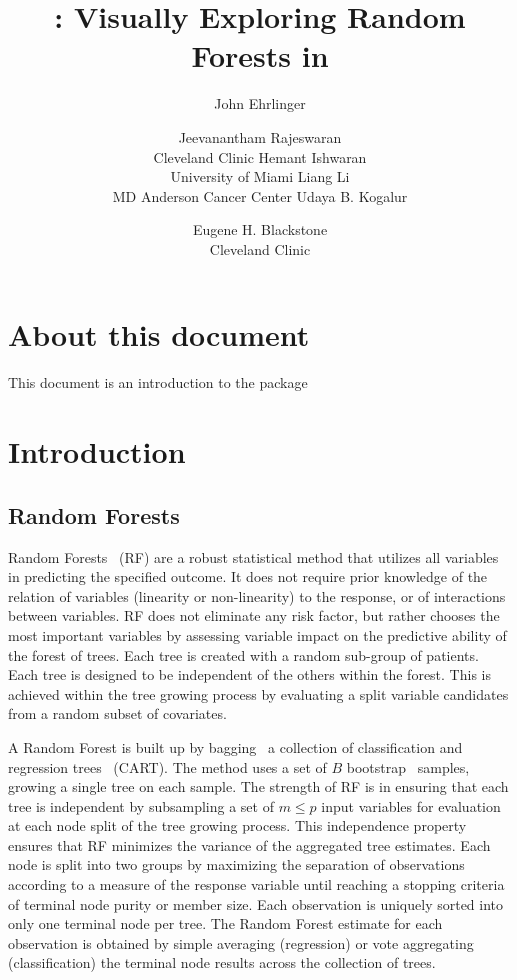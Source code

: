 \documentclass[nojss]{jss}\usepackage[]{graphicx}\usepackage[]{color}
\author{John Ehrlinger \and Jeevanantham Rajeswaran\\Cleveland Clinic 
\AND Hemant Ishwaran \\University of Miami
\And Liang Li\\MD Anderson Cancer Center
\AND Udaya B. Kogalur \and Eugene H. Blackstone\\Cleveland Clinic}
\title{{\pkg{ggRandomForests}}: Visually Exploring Random Forests in \proglang{R}}
\begin{document}



\section{About this document}
This document is an introduction to the  package

\section{Introduction} \label{S:introduction}


\subsection{Random Forests}\label{S:rf}
Random Forests~\citep{Breiman:2001} (RF) are a robust statistical method that utilizes all variables in predicting the specified outcome. It does not require prior knowledge of the relation of variables (linearity or non-linearity) to the response, or of interactions between variables. RF does not eliminate any risk factor, but rather chooses the most important variables by assessing variable impact on the predictive ability of the forest of trees. Each tree is created with a random sub-group of patients. Each tree is designed to be independent of the others within the forest. This is achieved within the tree growing process by evaluating a split variable candidates from a random subset of covariates.

A Random Forest is built up by bagging~\citep{Breiman:1996} a collection of classification and regression trees~\citep{cart:1984} (CART). The method uses a set of $B$ bootstrap~\citep{bootstrap:1994} samples, growing a single tree on each sample. The strength of RF is in ensuring that each tree is independent by subsampling a set of $m \le p$ input variables for evaluation at each node split of the tree growing process. This independence property ensures that RF minimizes the variance of the aggregated tree estimates. Each node is split into two groups by maximizing the separation of observations according to a measure of the response variable until reaching a stopping criteria of terminal node purity or member size. Each observation is uniquely sorted into only one terminal node per tree. The Random Forest estimate for each observation is obtained by simple averaging (regression) or vote aggregating (classification) the terminal node results across the collection of trees. 
\end{document}
